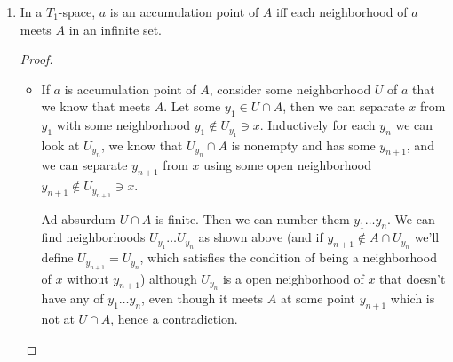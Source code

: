 \documentclass[a4paper]{article}
\begin{document}
	\begin{enumerate}
		\item In a $T_1$-space, $a$ is an accumulation point of $A$ iff each neighborhood of $a$ meets $A$ in an infinite set. \begin{proof}
			\begin{itemize}
				\item[$\implies$]If $a$ is accumulation point of $A$, consider some neighborhood $U$ of $a$ that we know that meets $A$. Let some $y_1 \in U \cap A$, then we can separate $x$ from $y_1$ with some neighborhood $y_1 \notin U_{y_1} \ni x$. Inductively for each $y_n$ we can look at $U_{y_n}$, we know that $U_{y_n} \cap A$ is nonempty and has some $y_{n + 1}$, and we can separate $y_{n + 1}$ from $x$ using some open neighborhood $y_{n + 1} \notin U_{y_{n + 1}} \ni x$. 
				
				Ad absurdum $U \cap A$ is finite. Then we can number them $y_1 \dots y_n$. We can find neighborhoods $U_{y_1} \dots U_{y_n}$ as shown above (and if $y_{n + 1} \notin A \cap U_{y_n}$ we'll define $U_{y_{n + 1}} = U_{y_n}$, which satisfies the condition of being a neighborhood of $x$ without $y_{n + 1}$) although $U_{y_{n}}$ is a open neighborhood of $x$ that doesn't have any of $y_1 \dots y_n$, even though it meets $A$ at some point $y_{n + 1}$ which is not at $U \cap A$, hence a contradiction. 
				

\end{itemize}
\end{proof}
\end{enumerate}
\end{document}
